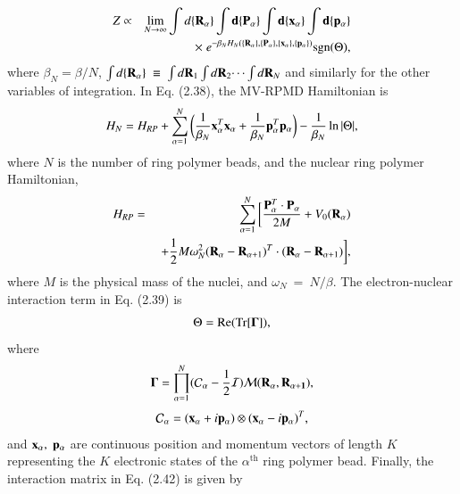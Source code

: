 \documentclass[phd,tocprelim]{cornell}
\begin{document}
\begin{eqnarray}
\nonumber
Z & \propto & \lim_{N \rightarrow \infty} 
\int d \{\bf{R}_{\alpha}\} \int d \{\bf{P}_{\alpha}\} 
\int d \{\bf{x}_{\alpha}\} \int d \{\bf{p}_{\alpha}\} \\
&&\;\;\;\times\; e^{-\beta_N H_N
(\{\bf{R}_{\alpha}\},
\{\bf{P}_{\alpha}\},
\{\bf{x}_{\alpha}\},
\{\bf{p}_{\alpha}\})}\textrm{sgn}(\Theta),
\label{eq:mvqbd} 
\end{eqnarray} 
where $\beta_N = \beta/N$, $\int d\{{\bf{R}}_\alpha\}~\equiv~\int d{\bf R}_1 
\int d{\bf R}_2\dots \int d{{\bf {R}}_N}$ and similarly
for the other variables of integration.
In Eq. (2.38), the MV-RPMD Hamiltonian is 
\begin{equation} \label{eq:mvrpham} H_N =
H_{RP} +\sum_{\alpha=1}^{N} \bigg(
\frac{1}{\beta_N} {\bf{x}}_{\alpha}^T
{\bf{x}}_{\alpha} +\frac{1}{\beta_N}
{\bf{p}}_{\alpha}^T {\bf{p}}_{\alpha}\bigg)
- \frac{1}{\beta_N}\ln |\Theta|,
\end{equation} 
where $N$ is the number of ring polymer beads, 
and the nuclear ring polymer Hamiltonian,
\begin{eqnarray}
\nonumber
H_{RP}&=&\sum_{\alpha=1}^{N}
\bigg[\frac{ {\bf P}_\alpha^T\cdot{\bf P}_\alpha}{2M} +
V_0({\bf R}_\alpha) \\
 &&\;+ \frac{1}{2} M \omega_{N}^2
({\bf R}_{\alpha} - {\bf R}_{\alpha +1})^T \cdot ({\bf R}_{\alpha} - {\bf R}_{\alpha +1})\bigg],
\label{eq:rpham}
\end{eqnarray}
where $M$ is the physical mass of the nuclei, and 
$\omega_N~=~N/\beta$.
The electron-nuclear interaction term 
in Eq. (2.39) is 
\begin{equation}
\label{eq:theta} 
\Theta = \textrm{Re}(\textrm{Tr} [ {\bf{\Gamma}}] ) ,
\end{equation} 
where 
\begin{equation} \label{eq:gamma} {\bf{\Gamma}}
= \prod_{\alpha=1}^{N} (
\mathcal{C}_{\alpha} - \frac{1}{2}
\mathcal{I})
\mathcal{M}(\bf{R}_{\alpha},{\bf R}_{\alpha+1}),
\end{equation}
\begin{equation} \label{eq:cmat}
\mathcal{C}_{\alpha} = ({\bf{x}}_{\alpha}
+ i{\bf{p}}_{\alpha}) \otimes
({\bf{x}}_{\alpha} - i{\bf{p}}_{\alpha})^T,
\end{equation}
and $\bf{x}_{\alpha},\;\bf{p}_{\alpha}$
are continuous position and momentum 
vectors of length $K$ representing 
the $K$ electronic states of the 
$\alpha^{\textrm{th}}$ ring polymer bead.
Finally, the interaction matrix in 
Eq. (2.42) is given by 
\end{document}
